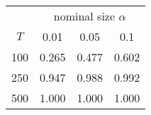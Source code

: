 % 
\begin{tabular}{cccc}
  \hline
  & \multicolumn{3}{c}{nominal size $\alpha$} \\
 $T$ & 0.01 & 0.05 & 0.1 \\
 \hline
100 & 0.265 & 0.477 & 0.602 \\ 
  250 & 0.947 & 0.988 & 0.992 \\ 
  500 & 1.000 & 1.000 & 1.000 \\ 
   \hline
\end{tabular}
